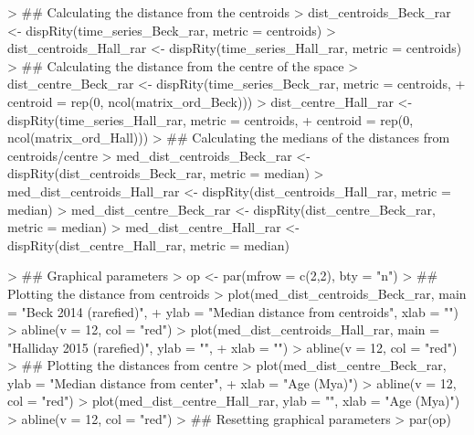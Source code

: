 \documentclass{article}
\begin{document}
\begin{Schunk}
\begin{Sinput}
> ## Calculating the distance from the centroids
> dist_centroids_Beck_rar <- dispRity(time_series_Beck_rar, metric = centroids)
> dist_centroids_Hall_rar <- dispRity(time_series_Hall_rar, metric = centroids)
> ## Calculating the distance from the centre of the space
> dist_centre_Beck_rar <- dispRity(time_series_Beck_rar, metric = centroids,
+                                centroid = rep(0, ncol(matrix_ord_Beck)))
> dist_centre_Hall_rar <- dispRity(time_series_Hall_rar, metric = centroids,
+                                centroid = rep(0, ncol(matrix_ord_Hall)))
> ## Calculating the medians of the distances from centroids/centre
> med_dist_centroids_Beck_rar <- dispRity(dist_centroids_Beck_rar, metric = median)
> med_dist_centroids_Hall_rar <- dispRity(dist_centroids_Hall_rar, metric = median)
> med_dist_centre_Beck_rar <- dispRity(dist_centre_Beck_rar, metric = median)
> med_dist_centre_Hall_rar <- dispRity(dist_centre_Hall_rar, metric = median)
\end{Sinput}
\end{Schunk}

\begin{Schunk}
\begin{Sinput}
> ## Graphical parameters
> op <- par(mfrow = c(2,2), bty = "n")
> ## Plotting the distance from centroids
> plot(med_dist_centroids_Beck_rar, main = "Beck 2014 (rarefied)",
+     ylab = "Median distance from centroids", xlab = "")
> abline(v = 12, col = "red")
> plot(med_dist_centroids_Hall_rar, main = "Halliday 2015 (rarefied)", ylab = "",
+     xlab = "")
> abline(v = 12, col = "red")
> ## Plotting the distances from centre
> plot(med_dist_centre_Beck_rar, ylab = "Median distance from center",
+     xlab = "Age (Mya)")
> abline(v = 12, col = "red")
> plot(med_dist_centre_Hall_rar, ylab = "", xlab = "Age (Mya)")
> abline(v = 12, col = "red")
> ## Resetting graphical parameters
> par(op)
\end{Sinput}
\end{Schunk}
\end{document}

